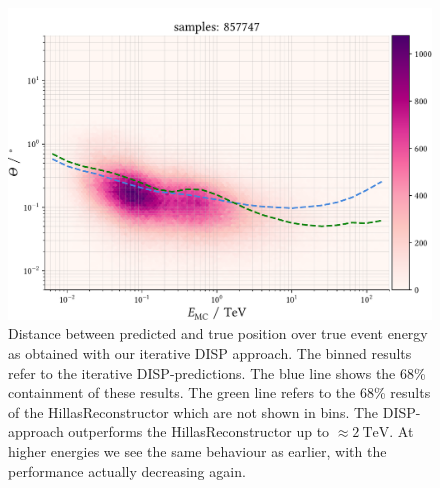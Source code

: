 \begin{figure}
    \centering
    \captionsetup{width=0.9\linewidth}
    \includegraphics[width=0.9\linewidth]{../analysis/plots/gamma/pairwise_median_100_vs_energy.pdf} 
    \caption{Distance between predicted and true position over true event energy as obtained with our
    iterative DISP approach.
    The binned results refer to the iterative DISP-predictions. The blue line shows the 
    68\% containment of these results. The green line refers to the 68\%
    results of the HillasReconstructor which are not shown in bins.
    The DISP-approach outperforms the HillasReconstructor up to
    $\approx \SI{2}{\tera\electronvolt}$.
    At higher energies we see the same behaviour as earlier, with the performance actually
    decreasing again.}
    \label{fig:stereo_magic_energy}
\end{figure}

